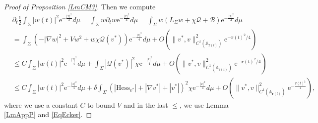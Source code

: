 \documentclass[12pt]{amsart}
\numberwithin{equation}{section}
\numberwithin{equation}{section}
\newcommand{\dt}{\delta}
\begin{document}
\begin{proof}[Proof of Proposition \ref{LmCM3}]
		Then we compute
		\begin{equation}\label{Eq1stDifference}
			\begin{aligned}
				&\partial_t \frac12\int_\Sigma |w(t)|^2 \mathrm{e}^{-\frac{|x|^2}{4}}d\mu = \int_\Sigma w\partial_t w\mathrm{e}^{-\frac{|x|^2}{4}}d\mu
				=\int_\Sigma w(  L_\Sigma w+\chi \mathcal Q+\mathcal B) \mathrm{e}^{-\frac{|x|^2}{4}}d\mu\\
				&=\int_\Sigma \left(-|\nabla w|^2 +Vw^2+ w\chi\mathcal Q(v^*)\right) \mathrm{e}^{-\frac{|x|^2}{4}}d\mu+O(\|v^*,v\|^2_{C^1(\mathbb A_{\mathbf r(t)})}\mathrm{e}^{-\mathbf r(t)^2/4})\\
				&\leq C\int_\Sigma |w(t)|^2 \mathrm{e}^{-\frac{|x|^2}{4}}d\mu+\int_\Sigma |\mathcal Q(v^*)|^2\chi \mathrm{e}^{-\frac{|x|^2}{4}}d\mu+O(\|v^*,v\|^2_{C^1(\mathbb A_{\mathbf r(t)})}\mathrm{e}^{-\mathbf r(t)^2/4})\\
				&\leq C\int_\Sigma |w(t)|^2 \mathrm{e}^{-\frac{|x|^2}{4}}d\mu+\dt\int_\Sigma (|\mathrm{Hess}_{v^*}|+|\nabla v^*|+|v^*|)^2\chi \mathrm{e}^{-\frac{|x|^2}{4}}d\mu+O(\|v^*,v\|^2_{C^1(\mathbb A_{\mathbf r(t)})}\mathrm{e}^{-\frac{\mathbf r(t)^2}{4}}),
			\end{aligned}
		\end{equation}
		where we use a constant $C$ to bound $V$ and in the last $\leq$, we use Lemma \ref{LmAppP} and \eqref{EqEcker}. 
		

\end{proof}
\end{document}
